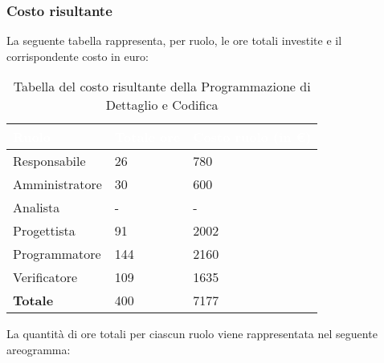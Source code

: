 \subsubsection{Costo risultante}
La seguente tabella rappresenta, per ruolo, le ore totali investite e il corrispondente costo in euro:
{
\renewcommand{\arraystretch}{2}
\begin{longtable}{ C{3cm} C{2cm} C{4cm}}
\caption{Tabella del costo risultante della Programmazione di Dettaglio e Codifica}\\

\textcolor{white}{\textbf{Ruolo}} & 
\textcolor{white}{\textbf{Totale ore}} & 
\textcolor{white}{\textbf{Costo ruolo (in \euro{})}}\\	
\endhead
        
Responsabile    &  26 &  780 \\
Amministratore  &  30 &  600 \\
Analista        &   - &    - \\
Progettista     &  91 & 2002 \\
Programmatore   & 144 & 2160 \\
Verificatore    & 109 & 1635 \\
\textbf{Totale} & 400 & 7177 \\
		
\end{longtable}
}


\vskip 100pt %
La quantità di ore totali per ciascun ruolo viene rappresentata nel seguente areogramma:
\begin{center}
\end{center}